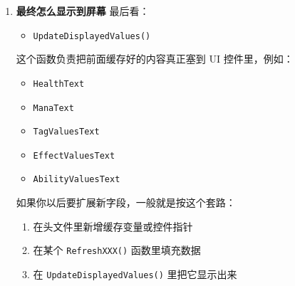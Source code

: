 \begin{enumerate}
	\begin{itemize}
		\item \texttt{Stack}
		\item \texttt{Duration}
		\item \texttt{RemainingTime}
		\item \texttt{Period}
		\item \texttt{GrantedTags}
	\end{itemize}
	
	这部分对理解 GAS 的运行态信息很有帮助。
	
	\paragraph{3. \texttt{RefreshActivatableAbilities()}}
	这个函数主要学习：
	
	\begin{itemize}
		\item 如何枚举 \texttt{GetActivatableAbilities()}
		\item 如何读取 Ability 的名称、等级、输入 ID、激活状态
	\end{itemize}
	
	\item \textbf{最终怎么显示到屏幕}
	最后看：
	
	\begin{itemize}
		\item \texttt{UpdateDisplayedValues()}
	\end{itemize}
	
	这个函数负责把前面缓存好的内容真正塞到 UI 控件里，例如：
	
	\begin{itemize}
		\item \texttt{HealthText}
		\item \texttt{ManaText}
		\item \texttt{TagValuesText}
		\item \texttt{EffectValuesText}
		\item \texttt{AbilityValuesText}
	\end{itemize}
	
	如果你以后要扩展新字段，一般就是按这个套路：
	
	\begin{enumerate}
		\item 在头文件里新增缓存变量或控件指针
		\item 在某个 \texttt{RefreshXXX()} 函数里填充数据
		\item 在 \texttt{UpdateDisplayedValues()} 里把它显示出来
	\end{enumerate}
	
\end{enumerate}

